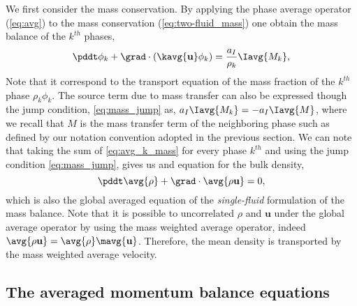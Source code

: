 We first consider the mass conservation. 
By applying the phase average operator (\ref{eq:avg}) to the mass conservation (\ref{eq:two-fluid_mass}) one obtain the mass balance of the $k^{th}$ phases, 
\begin{equation}
    \pddt \phi_k 
    + \grad \cdot \left(
        \kavg{\textbf{u}}\phi_k 
    \right) 
    = \frac{a_I}{\rho_k}\Iavg{M_k},
    \label{eq:avg_k_mass}
\end{equation}
Note that it correspond to the transport equation of the mass fraction of the 
$k^{th}$ phase $\rho_k \phi_k$. 
The source term due to mass transfer can also be expressed though the jump condition, 
\ref{eq:mass_jump} as, $a_I\Iavg{M_k} = - a_I\Iavg{M}$, where we recall that $M$ is the mass transfer term of the neighboring phase such as defined by our notation convention adopted in the previous section. 
We can note that taking the sum of \ref{eq:avg_k_mass} for every phase $k^{th}$ and using the jump condition \ref{eq:mass_jump}, gives us and equation for the bulk density,
\begin{equation}
    \pddt \avg{\rho}
    + \grad \cdot 
        \avg{\rho\textbf{u}} 
    = 0,
    \label{eq:avg_mass}
\end{equation}
which is also the global averaged equation of the \textit{single-fluid} formulation of the mass balance. 
Note that it is possible to uncorrelated $\rho$ and $\textbf{u}$ under the global average operator by using the mass weighted average operator, indeed $\avg{\rho\textbf{u}} = \avg{\rho}\mavg{\textbf{u}}$.
Therefore, the mean density is transported by the mass weighted average velocity. 

\subsection{The averaged momentum balance equations}

